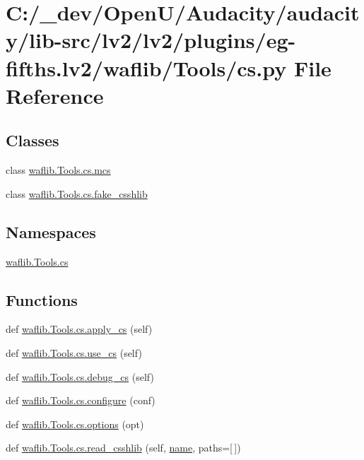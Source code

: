 \hypertarget{lv2_2plugins_2eg-fifths_8lv2_2waflib_2_tools_2cs_8py}{}\section{C\+:/\+\_\+dev/\+Open\+U/\+Audacity/audacity/lib-\/src/lv2/lv2/plugins/eg-\/fifths.lv2/waflib/\+Tools/cs.py File Reference}
\label{lv2_2plugins_2eg-fifths_8lv2_2waflib_2_tools_2cs_8py}
\subsection*{Classes}
\begin{DoxyCompactItemize}
\item 
class \hyperlink{classwaflib_1_1_tools_1_1cs_1_1mcs}{waflib.\+Tools.\+cs.\+mcs}
\item 
class \hyperlink{classwaflib_1_1_tools_1_1cs_1_1fake__csshlib}{waflib.\+Tools.\+cs.\+fake\+\_\+csshlib}
\end{DoxyCompactItemize}
\subsection*{Namespaces}
\begin{DoxyCompactItemize}
\item 
 \hyperlink{namespacewaflib_1_1_tools_1_1cs}{waflib.\+Tools.\+cs}
\end{DoxyCompactItemize}
\subsection*{Functions}
\begin{DoxyCompactItemize}
\item 
def \hyperlink{namespacewaflib_1_1_tools_1_1cs_a27e68865096cf54da13a1d0d563bd4c2}{waflib.\+Tools.\+cs.\+apply\+\_\+cs} (self)
\item 
def \hyperlink{namespacewaflib_1_1_tools_1_1cs_a2962c0e94d37d4610f58b0e4911fbd9f}{waflib.\+Tools.\+cs.\+use\+\_\+cs} (self)
\item 
def \hyperlink{namespacewaflib_1_1_tools_1_1cs_ae5dd9312be558c0712218cdab22724b4}{waflib.\+Tools.\+cs.\+debug\+\_\+cs} (self)
\item 
def \hyperlink{namespacewaflib_1_1_tools_1_1cs_a97849d425e4332772dd4982ae091360f}{waflib.\+Tools.\+cs.\+configure} (conf)
\item 
def \hyperlink{namespacewaflib_1_1_tools_1_1cs_a20f520fa6e5a8eb6b064f7c5c82be0e0}{waflib.\+Tools.\+cs.\+options} (opt)
\item 
def \hyperlink{namespacewaflib_1_1_tools_1_1cs_aa175024b17365922ae423f6846c3ca7f}{waflib.\+Tools.\+cs.\+read\+\_\+csshlib} (self, \hyperlink{lib_2expat_8h_a1b49b495b59f9e73205b69ad1a2965b0}{name}, paths=\mbox{[}$\,$\mbox{]})
\end{DoxyCompactItemize}
